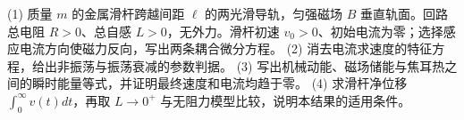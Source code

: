 (1) 质量 \(m\) 的金属滑杆跨越间距 \(\ell\) 的两光滑导轨，匀强磁场 \(B\) 垂直轨面。回路总电阻 \(R>0\)、总自感 \(L>0\)，无外力。滑杆初速 \(v_0>0\)、初始电流为零；选择感应电流方向使磁力反向，写出两条耦合微分方程。
(2) 消去电流求速度的特征方程，给出非振荡与振荡衰减的参数判据。
(3) 写出机械动能、磁场储能与焦耳热之间的瞬时能量等式，并证明最终速度和电流均趋于零。
(4) 求滑杆净位移 \(\int_0^\infty v(t)dt\)，再取 \(L\to0^+\) 与无阻力模型比较，说明本结果的适用条件。
